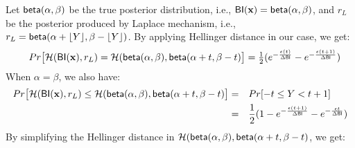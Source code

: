 \documentclass{article}
\begin{document}
Let $\mathsf{beta}(\alpha, \beta)$ be the true posterior distribution, i.e., $\mathsf{BI}(\textbf{x}) = \mathsf{beta}(\alpha, \beta)$, and $r_L$ be the posterior produced by Laplace mechanism, i.e., $r_L = \mathsf{beta}(\alpha + \lfloor Y \rfloor, \beta - \lfloor Y \rfloor)$. By applying Hellinger distance in our case, we get:
$$
\begin{array}{rcl}
& Pr\big[\mathcal{H}(\mathsf{BI}(\textbf{x}), r_L ) 
= \mathcal{H}(\mathsf{beta}(\alpha, \beta), \mathsf{beta}(\alpha + t, \beta - t)\big] 
=  \frac{1}{2} (e^{- \frac{\epsilon (t)}{\Delta \mathsf{BI}}} - e^{- \frac{\epsilon (t + 1)}{\Delta \mathsf{BI}}})\\
\end{array}
$$
When $\alpha = \beta$, we also have:
\begin{align*}
 Pr\big[\mathcal{H}(\mathsf{BI}(\textbf{x}), r_L ) 
\leq \mathcal{H}(\mathsf{beta}(\alpha, \beta), \mathsf{beta}(\alpha + t, \beta - t)\big] 
  = \quad & Pr[ - t \leq Y < t + 1] \\
  = \quad & \frac{1}{2} (1 - e^{- \frac{\epsilon (t + 1)}{\Delta \mathsf{BI}}}- e^{- \frac{\epsilon t}{\Delta \mathsf{BI}}})\\
 \end{align*}
 By simplifying the Hellinger distance in $\mathcal{H}(\mathsf{beta}(\alpha, \beta), \mathsf{beta}(\alpha + t, \beta - t)$, we get:
\end{document}
